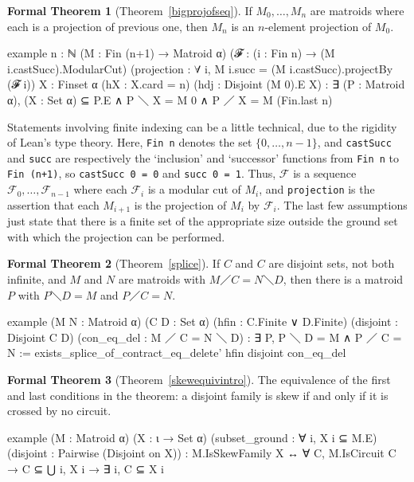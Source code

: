 \documentclass{amsart}
\theoremstyle{plain}
\theoremstyle{definition}
\newcommand{\cF}{\mathcal{F}}
\newcommand{\smalltt}[1]{{\small\texttt{#1}}}
\newtheorem*{fthm}{Formal Theorem}
\begin{document}
\begin{fthm}[Theorem~\ref{bigprojofseq}]
  If $M_0, \dotsc, M_n$ are matroids where each is a projection of previous one, 
  then $M_n$ is an $n$-element projection of $M_0$. 
  \begin{leancode}
example {n : ℕ} (M : Fin (n+1) → Matroid α) 
  (𝓕 : (i : Fin n) → (M i.castSucc).ModularCut)
  (projection : ∀ i, M i.succ = (M i.castSucc).projectBy (𝓕 i))
  {X : Finset α} (hX : X.card = n) (hdj : Disjoint (M 0).E X) :
  ∃ (P : Matroid α), 
    (X : Set α) ⊆ P.E ∧ P ＼ X = M 0 ∧ P ／ X = M (Fin.last n) 
  \end{leancode}
  Statements involving finite indexing can be a little technical, 
  due to the rigidity of Lean's type theory. 
  Here, \smalltt{Fin n} denotes the set $\{0, \dotsc, n-1\}$, 
  and \smalltt{castSucc} and \smalltt{succ} are respectively the 
  `inclusion' and `successor'
  functions from \smalltt{Fin n} to \smalltt{Fin (n+1)},
  so \smalltt{castSucc 0 = 0} and \smalltt{succ 0 = 1}. 
  Thus, $\mathcal{\cF}$ is a sequence $\cF_0, \dotsc, \cF_{n-1}$ 
  where each $\cF_i$ is a modular cut of $M_i$, 
  and \smalltt{projection} is the assertion that each $M_{i+1}$ is the projection
  of $M_i$ by $\cF_i$. The last few assumptions just state that there 
  is a finite set of the appropriate size outside the ground set 
  with which the projection can be performed. 
\end{fthm}

\begin{fthm}[Theorem~\ref{splice}]
If $C$ and $C$ are disjoint sets, not both infinite,
and $M$ and $N$ are matroids with $M ／ C = N ＼ D$,
then there is a matroid $P$ with $P ＼ D = M$ and $P ／ C = N$.
\begin{leancode}
example (M N : Matroid α) (C D : Set α) (hfin : C.Finite ∨ D.Finite) 
  (disjoint : Disjoint C D)
  (con_eq_del : M ／ C = N ＼ D) : ∃ P, P ＼ D = M ∧ P ／ C = N :=
  exists_splice_of_contract_eq_delete' hfin disjoint con_eq_del
\end{leancode}
\end{fthm}

\begin{fthm}[Theorem~\ref{skewequivintro}]
  The equivalence of the first and last conditions in the theorem: a disjoint 
  family is skew if and only if it is crossed by no circuit. 
  \begin{leancode}
example (M : Matroid α) (X : ι → Set α) (subset_ground : ∀ i, X i ⊆ M.E)
  (disjoint : Pairwise (Disjoint on X)) :
  M.IsSkewFamily X ↔ ∀ C, M.IsCircuit C → C ⊆ ⋃ i, X i → ∃ i, C ⊆ X i
  \end{leancode}
\end{fthm}
\end{document}
